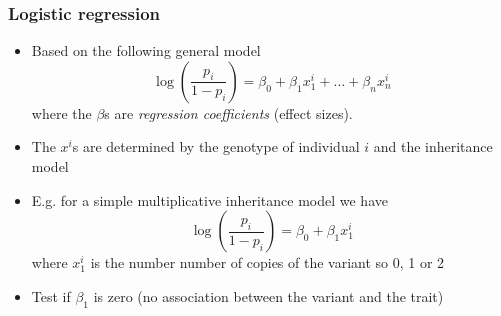 \documentclass[xcolor=pdftex,dvipsnames,table,10pt]{beamer}
\begin{document}


\begin{frame}
  \frametitle{Logistic regression}
  \small \vspace{-0.7cm}
  \begin{itemize}
  \item<1-> Based on the following general model  
   \[ \log \left(\frac{p_i}{1-p_i}  \right)=\beta_0 +\beta_1x^i_1+\ldots +\beta_nx^i_n\] where the $\beta$s are \emph{regression coefficients} (effect sizes).
   \item<1-> The $x^i$s are determined by the genotype of individual $i$ and the inheritance model 
 \item<2-> E.g. for a simple multiplicative inheritance model we have 
 \[ \log \left(\frac{p_i}{1-p_i}  \right)=\beta_0 +\beta_1x^i_1\]
    where $x^i_1$ is the number number of copies of the variant so 0, 1 or 2%
 \item<3-> Test if $\beta_1$ is zero (no association between the variant and the trait) %
  \end{itemize}
\end{frame}
\end{document}
